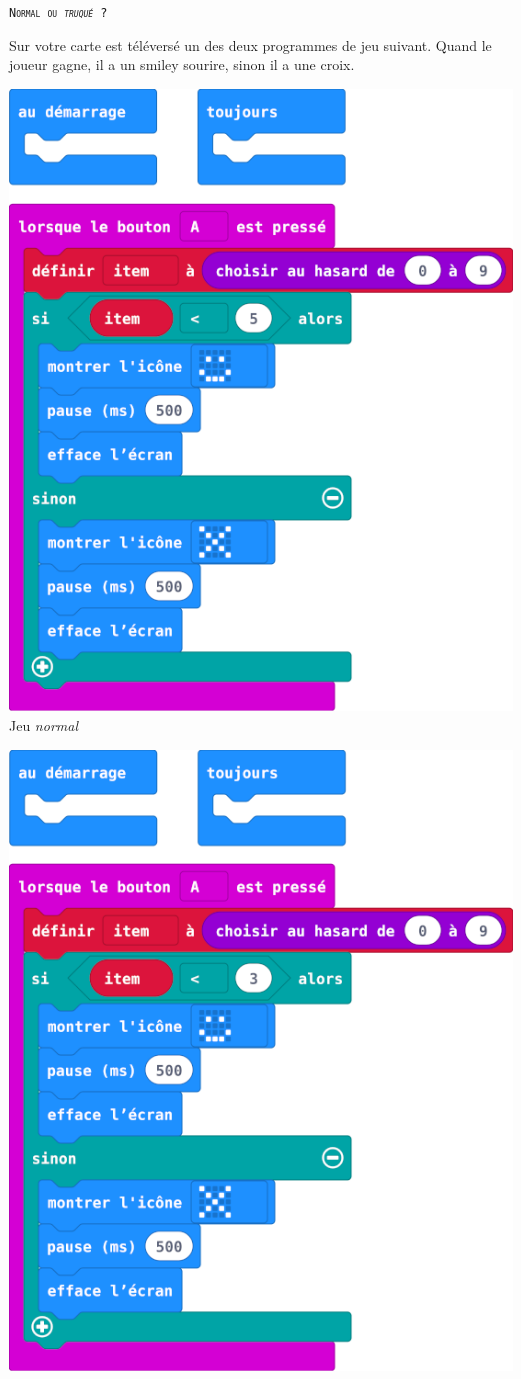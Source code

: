 \begin{eleve}    
    \texttt{\textsc{Normal ou \emph{truqué} ?}}
    
    Sur votre carte est téléversé un des deux programmes de jeu suivant. Quand le joueur gagne, il a un smiley sourire, sinon il a  une croix. 
    
    
    
\begin{minipage}[t]{0.5\linewidth}
    \begin{center}
        \vspace{0cm}
        \includegraphics[width=0.7\linewidth]{res/mb-normal.png}\\
        Jeu \emph{normal}
    \end{center}
\end{minipage}
\hfill
\begin{minipage}[t]{0.5\linewidth}
    \begin{center}
        \vspace{0cm}
        \includegraphics[width=0.7\linewidth]{res/mb-truque.png}\\

\end{center}
\end{minipage}
\end{eleve}
